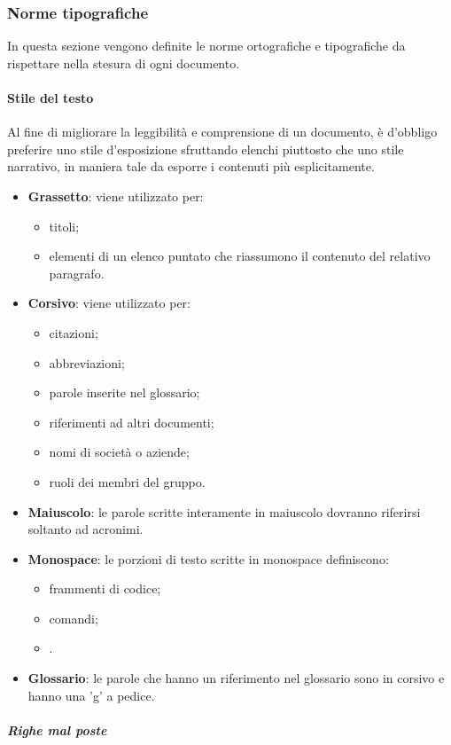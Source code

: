 \subsubsection{Norme tipografiche}
In questa sezione vengono definite le norme ortografiche e tipografiche da rispettare nella stesura di ogni documento.
 \paragraph{Stile del testo}
 Al fine di migliorare la leggibilità e comprensione di un documento, è d'obbligo preferire uno stile d'esposizione sfruttando elenchi piuttosto che uno stile narrativo, in maniera tale da esporre i contenuti più esplicitamente.	
\begin{itemize}
	\item \textbf{Grassetto}: viene utilizzato per:
	\begin{itemize}
		\item titoli;
		\item elementi di un elenco puntato che riassumono il contenuto del relativo paragrafo.
	\end{itemize}
	\item \textbf{Corsivo}: viene utilizzato per:
	\begin{itemize}
		\item citazioni;
		\item abbreviazioni;
		\item parole inserite nel glossario;
		\item riferimenti ad altri documenti;
		\item nomi di società o aziende;
		\item ruoli dei membri del gruppo.
	\end{itemize}
	\item \textbf{Maiuscolo}: le parole scritte interamente in maiuscolo dovranno riferirsi soltanto ad acronimi.
	\item \textbf{Monospace}: le porzioni di testo scritte in monospace definiscono:
	\begin{itemize}
		\item frammenti di codice;
		\item comandi;
		\item {}.
	\end{itemize}
	\item \textbf{Glossario}: le parole che hanno un riferimento nel glossario sono in corsivo e hanno una 'g' a pedice.
\end{itemize}
\subparagraph{Righe mal poste}

